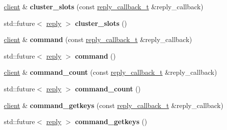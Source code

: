 \begin{DoxyCompactItemize}
\hyperlink{classcpp__redis_1_1client}{client} \& {\bfseries cluster\+\_\+slots} (const \hyperlink{classcpp__redis_1_1client_a061a1140d36d2eaeda82b09a0bb3f9f2}{reply\+\_\+callback\+\_\+t} \&reply\+\_\+callback)
\item 
\mbox{\label{classcpp__redis_1_1client_a9dc222141ab85da05efbce7a7ff0a7d1}} 
std\+::future$<$ \hyperlink{classcpp__redis_1_1reply}{reply} $>$ {\bfseries cluster\+\_\+slots} ()
\item 
\mbox{\label{classcpp__redis_1_1client_accac4fab4be3f71b94fc0aa02496f6a3}} 
\hyperlink{classcpp__redis_1_1client}{client} \& {\bfseries command} (const \hyperlink{classcpp__redis_1_1client_a061a1140d36d2eaeda82b09a0bb3f9f2}{reply\+\_\+callback\+\_\+t} \&reply\+\_\+callback)
\item 
\mbox{\label{classcpp__redis_1_1client_a93ef2e84647990d02aa67a1e22341b38}} 
std\+::future$<$ \hyperlink{classcpp__redis_1_1reply}{reply} $>$ {\bfseries command} ()
\item 
\mbox{\label{classcpp__redis_1_1client_a639c7fd5c7899ba474e65513ee337bea}} 
\hyperlink{classcpp__redis_1_1client}{client} \& {\bfseries command\+\_\+count} (const \hyperlink{classcpp__redis_1_1client_a061a1140d36d2eaeda82b09a0bb3f9f2}{reply\+\_\+callback\+\_\+t} \&reply\+\_\+callback)
\item 
\mbox{\label{classcpp__redis_1_1client_af0cac37a62edbd7d699b379551f1ef9a}} 
std\+::future$<$ \hyperlink{classcpp__redis_1_1reply}{reply} $>$ {\bfseries command\+\_\+count} ()
\item 
\mbox{\label{classcpp__redis_1_1client_a3d23ff98ee82a404373d75b660720926}} 
\hyperlink{classcpp__redis_1_1client}{client} \& {\bfseries command\+\_\+getkeys} (const \hyperlink{classcpp__redis_1_1client_a061a1140d36d2eaeda82b09a0bb3f9f2}{reply\+\_\+callback\+\_\+t} \&reply\+\_\+callback)
\item 
\mbox{\label{classcpp__redis_1_1client_a18ab313316e99ab0a690540f40de80e3}} 
std\+::future$<$ \hyperlink{classcpp__redis_1_1reply}{reply} $>$ {\bfseries command\+\_\+getkeys} ()
\item 

\end{DoxyCompactItemize}
